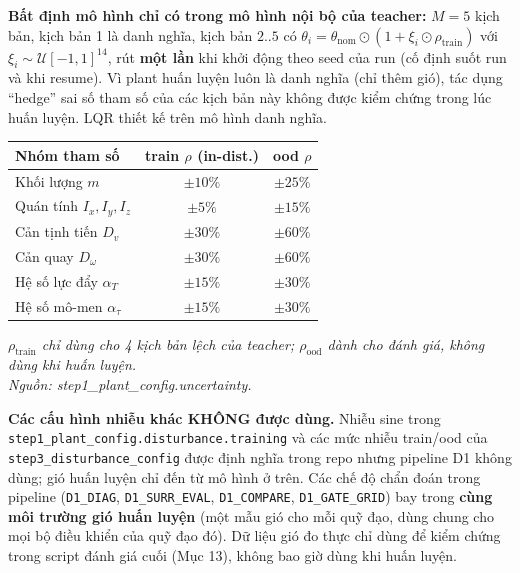 \documentclass[11pt]{article}
\begin{document}
\textbf{Bất định mô hình chỉ có trong mô hình nội bộ của teacher:} $M{=}5$ kịch bản, kịch bản 1 là danh
nghĩa, kịch bản $2..5$ có $\theta_i=\theta_{\mathrm{nom}}\odot(1+\xi_i\odot\rho_{\mathrm{train}})$ với
$\xi_i\sim\mathcal{U}[-1,1]^{14}$, rút \textbf{một lần} khi khởi động theo seed của run (cố định suốt run
và khi resume). Vì plant huấn luyện luôn là danh nghĩa (chỉ thêm gió), tác dụng ``hedge'' sai số tham số của
các kịch bản này không được kiểm chứng trong lúc huấn luyện. LQR thiết kế trên mô hình danh nghĩa.

\begin{center}\small
\begin{tabular}{@{}p{5.6cm} c c@{}}
\toprule
\textbf{Nhóm tham số} & \textbf{train $\rho$ (in-dist.)} & \textbf{ood $\rho$}\\
\midrule
Khối lượng $m$ & $\pm10\%$ & $\pm25\%$\\
Quán tính $I_x,I_y,I_z$ & $\pm5\%$ & $\pm15\%$\\
Cản tịnh tiến $D_v$ & $\pm30\%$ & $\pm60\%$\\
Cản quay $D_\omega$ & $\pm30\%$ & $\pm60\%$\\
Hệ số lực đẩy $\alpha_T$ & $\pm15\%$ & $\pm30\%$\\
Hệ số mô-men $\alpha_\tau$ & $\pm15\%$ & $\pm30\%$\\
\bottomrule
\end{tabular}
\end{center}
{\small\itshape $\rho_{\mathrm{train}}$ chỉ dùng cho 4 kịch bản lệch của teacher; $\rho_{\mathrm{ood}}$ dành cho
đánh giá, không dùng khi huấn luyện.\\ Nguồn: step1\_plant\_config.uncertainty.}

\noindent\textbf{Các cấu hình nhiễu khác KHÔNG được dùng.} Nhiễu sine trong
\texttt{step1\_\allowbreak plant\_\allowbreak config.\allowbreak disturbance.\allowbreak training} và các mức nhiễu train/ood của
\texttt{step3\_disturbance\_config} được định nghĩa trong repo nhưng pipeline D1 không dùng; gió huấn luyện
chỉ đến từ mô hình ở trên. Các chế độ chẩn đoán trong pipeline (\texttt{D1\_DIAG}, \texttt{D1\_\allowbreak SURR\_\allowbreak EVAL},
\texttt{D1\_\allowbreak COMPARE}, \texttt{D1\_\allowbreak GATE\_\allowbreak GRID}) bay trong \textbf{cùng môi trường gió huấn
luyện} (một mẫu gió cho mỗi quỹ đạo, dùng chung cho mọi bộ điều khiển của quỹ đạo đó). Dữ liệu gió đo thực chỉ
dùng để kiểm chứng trong script đánh giá cuối (Mục 13), không bao giờ dùng khi huấn luyện.
\end{document}
